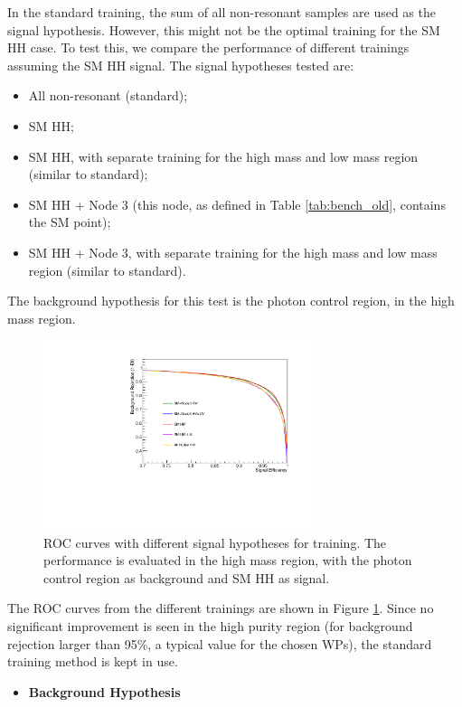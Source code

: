In the standard training, the sum of all non-resonant samples are used as the signal hypothesis. 
However, this might not be the optimal training for the SM HH case. 
To test this, we compare the performance of different trainings assuming the SM HH signal. 
The signal hypotheses tested are:
\begin{itemize}
\item All non-resonant (standard);
\item SM HH;
\item SM HH, with separate training for the high mass and low mass region (similar to standard);
\item SM HH + Node 3 (this node, as defined in Table \ref{tab:bench_old}, contains the SM point);
\item SM HH + Node 3, with separate training for the high mass and low mass region (similar to standard).
\end{itemize}
The background hypothesis for this test is the photon control region, in the high mass region. 

\begin{figure}[h]
  \centering
  \includegraphics[width=0.7\textwidth]{figures/sec-cats/mva/ROC}\hfil
  \caption{ROC curves with different signal hypotheses for training. The performance is evaluated in the high mass region, with the photon control region as background and SM HH as signal.}
  \label{fig:mva_cc_signal}
\end{figure}


The ROC curves from the different trainings are shown in Figure \ref{fig:mva_cc_signal}. 
Since no significant improvement is seen in the high purity region (for background rejection larger than 95\%, a typical value for the chosen WPs), the standard training method is kept in use. 

\begin{itemize}
\item \textbf{Background Hypothesis}
\end{itemize}

